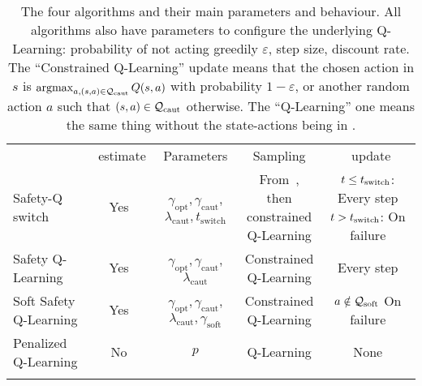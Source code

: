 \begin{table}
	\centering
	\begin{tabular}{l|cccc}
		 & \QV~estimate & Parameters & Sampling & \LQhat~update\\
		 \thickhline
		Safety-Q switch & Yes
								 & \multiline{$\gamma_\text{opt}, \gamma_\text{caut}$,\\
												 	 $\lambda_\text{caut}, t_\text{switch}$} 
								 & \multiline{From~\cite{heim2020learnable},\\then\\constrained\\Q-Learning}
								 & \multiline{$t\leq t_\text{switch}$:\\Every step\\$t > t_\text{switch}$:\\On failure}\\
		\hline
		Safety Q-Learning & Yes
									& \multiline{$\gamma_\text{opt}, \gamma_\text{caut}$,\\
										$\lambda_\text{caut}$}
									& \multiline{Constrained\\Q-Learning}
									& Every step\\
		\hline
		Soft Safety Q-Learning & Yes 
										   & \multiline{$\gamma_\text{opt}, \gamma_\text{caut}$,\\
										   	$\lambda_\text{caut},\gamma_\text{soft}$} 
										   & \multiline{Constrained\\Q-Learning}
										   & \multiline{$a\notin\mathcal{Q}_\text{soft}$\\On failure}\\
		\hline
		Penalized Q-Learning & No & $p$ & Q-Learning & None\\
		\thickhline
		
	\end{tabular}
\caption{The four algorithms and their main parameters and behaviour. All algorithms also have parameters to configure the underlying Q-Learning: probability of not acting greedily $\varepsilon$, step size, discount rate. The \enquote{Constrained Q-Learning} update means that the chosen action in $s$ is $\operatorname*{argmax}_{a, (s,a)\in\mathcal{Q}_\text{caut}}Q(s, a)$ with probability $1 - \varepsilon$, or another random action $a$ such that $(s, a)\in\mathcal{Q}_\text{caut}$ otherwise. The \enquote{Q-Learning} one means the same thing without the state-actions being in \Qcaut.}
\label{tab:algorithms}
\end{table}

